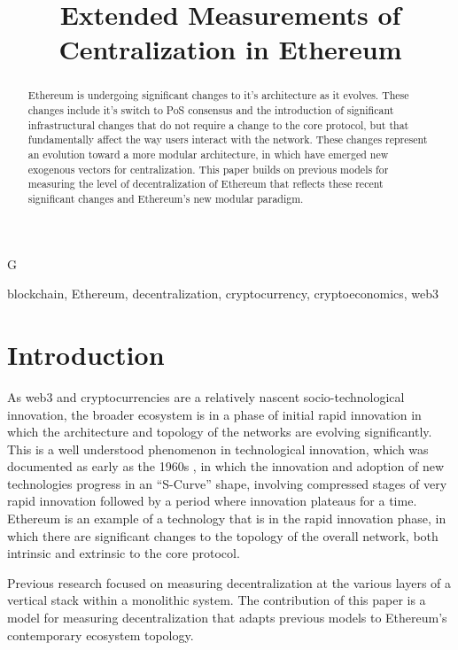 G\documentclass[conference]{IEEEtran}
\begin{document}
\title{Extended Measurements of Centralization in Ethereum}

\author{
}

\maketitle

\begin{abstract}
Ethereum is undergoing significant changes to it's architecture as it evolves.  These changes include it's switch to PoS consensus and the introduction of significant infrastructural changes that do not require a change to the core protocol, but that fundamentally affect the way users interact with the network.  These changes represent an evolution toward a more modular architecture, in which have emerged new exogenous vectors for centralization.  This paper builds on previous models for measuring the level of decentralization of Ethereum that reflects these recent significant changes and Ethereum's new modular paradigm.
\end{abstract}

\begin{IEEEkeywords}
blockchain, Ethereum, decentralization, cryptocurrency, cryptoeconomics, web3
\end{IEEEkeywords}

\section{Introduction}

As web3 and cryptocurrencies are a relatively nascent socio-technological innovation, the broader ecosystem is in a phase of initial rapid innovation in which the architecture and topology of the networks are evolving significantly.  This is a well understood phenomenon in technological innovation, which was documented as early as the 1960s \cite{rogers2010diffusion}, in which the innovation and adoption of new technologies progress in an “S-Curve” shape, involving compressed stages of very rapid innovation followed by a period where innovation plateaus for a time.  Ethereum is an example of a technology that is in the rapid innovation phase, in which there are significant changes to the topology of the overall network, both intrinsic and extrinsic to the core protocol.

Previous research \cite{gochhayat2020measuring, lin2021measuring, karakostas2022sok} focused on measuring decentralization at the various layers of a vertical stack within a monolithic system.  The contribution of this paper is a model for measuring decentralization that adapts previous models to Ethereum's contemporary ecosystem topology.
\end{document}
